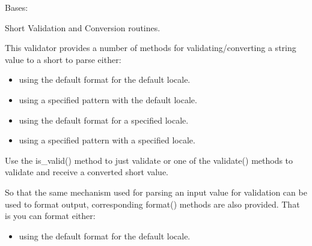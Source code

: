 \documentclass[letterpaper,10pt,english]{sphinxmanual}
\begin{document}
\begin{fulllineitems}
\label{\detokenize{apache_commons_validator_python.routines:apache_commons_validator_python.routines.short_validator.ShortValidator}}
\pysigstartsignatures
{}
\pysigstopsignatures
\sphinxAtStartPar
Bases: {\hyperref[\detokenize{apache_commons_validator_python.routines:apache_commons_validator_python.routines.abstract_number_validator.AbstractNumberValidator}]{}}

\sphinxAtStartPar
Short Validation and Conversion routines.

\sphinxAtStartPar
This validator provides a number of methods for validating/converting a string value
to a short to parse either:
\begin{itemize}
\item {} 
\sphinxAtStartPar
using the default format for the default locale.

\item {} 
\sphinxAtStartPar
using a specified pattern with the default locale.

\item {} 
\sphinxAtStartPar
using the default format for a specified locale.

\item {} 
\sphinxAtStartPar
using a specified pattern with a specified locale.

\end{itemize}

\sphinxAtStartPar
Use the is\_valid() method to just validate or one of the validate() methods to
validate and receive a converted short value.

\sphinxAtStartPar
So that the same mechanism used for parsing an input value for validation can be used to format output,
corresponding format() methods are also provided. That is you can format either:
\begin{itemize}
\item {} 
\sphinxAtStartPar
using the default format for the default locale.


\end{itemize}
\end{fulllineitems}
\end{document}
